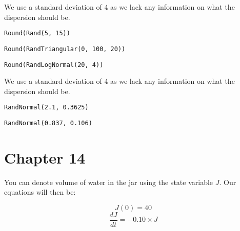 \documentclass[]{memoir}
\begin{document}
We use a standard deviation of 4 as we lack any information on what the
dispersion should be.

\lstinline!Round(Rand(5, 15))!


\lstinline!Round(RandTriangular(0, 100, 20))!


\lstinline!Round(RandLogNormal(20, 4))!

We use a standard deviation of 4 as we lack any information on what the
dispersion should be.


\lstinline!RandNormal(2.1, 0.3625)!


\lstinline!RandNormal(0.837, 0.106)!

\section{Chapter 14}


You can denote volume of water in the jar using the state variable $J$.
Our equations will then be:

\[ J(0) = 40 \] \[ \frac{dJ}{dt} = -0.10 \times J\]

\end{document}
